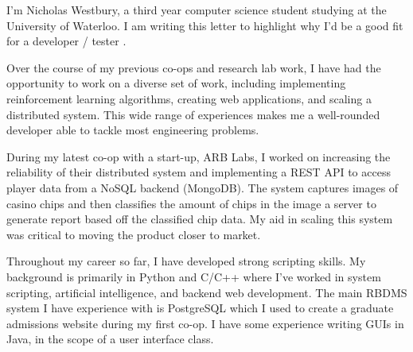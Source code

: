 \documentclass[11pt, a4paper]{awesome-cv} %
\begin{document}
\makecvheader %

\makelettertitle %


\begin{cvletter}



I'm Nicholas Westbury, a third year computer science student studying at the University of Waterloo. I am writing this letter to highlight why I’d be a good fit for a developer / tester .



Over the course of my previous co-ops and research lab work, I have had the opportunity to work on a diverse set of work, including implementing reinforcement learning algorithms, creating web applications, and scaling a distributed system. This wide range of experiences makes me a well-rounded developer able to tackle most engineering problems.

During my latest co-op with a start-up, ARB Labs, I worked on increasing the reliability of their distributed system and implementing a REST API to access player data from a NoSQL backend (MongoDB). The system captures images of casino chips and then classifies the amount of chips in the image a server to generate report based off the classified chip data. My aid in scaling this system was critical to moving the product closer to market.

Throughout my career so far, I have developed strong scripting skills. My background is primarily in Python and C/C++ where I've worked in system scripting, artificial intelligence, and backend web development. The main RBDMS system I have experience with is PostgreSQL which I used to create a graduate admissions website during my first co-op. I have some experience writing GUIs in Java, in the scope of a user interface class.

\end{cvletter}


\makeletterclosing %
\end{document}
